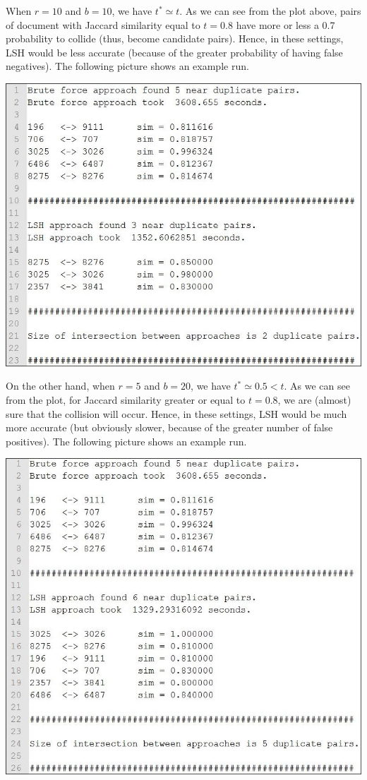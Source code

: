 \noindent When $r = 10$ and $b = 10$, we have $t^* \simeq t$. As we can see from the plot above, pairs of document with Jaccard similarity equal to $t = 0.8$ have more or less a 0.7 probability to collide (thus, become candidate pairs). Hence, in these settings, LSH would be less accurate (because of the greater probability of having false negatives). The following picture shows an example run.

\begin{center}
	\includegraphics[scale=0.45]{img/results_10_10.jpg}
\end{center}

\noindent On the other hand, when $r = 5$ and $b = 20$, we have $t^* \simeq 0.5 < t$. As we can see from the plot, for Jaccard similarity greater or equal to $t = 0.8$, we are (almost) sure that the collision will occur. Hence, in these settings, LSH would be much more accurate (but obviously slower, because of the greater number of false positives). The following picture shows an example run.

\begin{center}
	\includegraphics[scale=0.45]{img/results_20_5.jpg}
\end{center}
